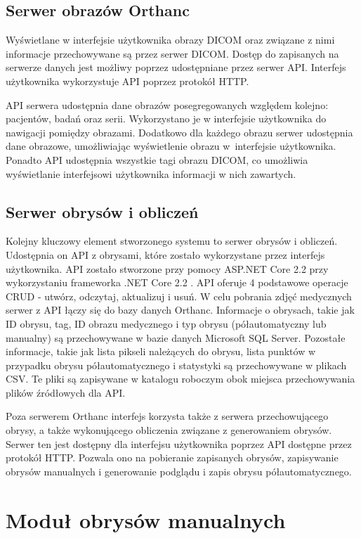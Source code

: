 \documentclass[a4paper,11pt,twoside,openright]{report}
\theoremstyle{definition}
\begin{document}
\subsection {Serwer obrazów Orthanc}

Wyświetlane w interfejsie użytkownika obrazy DICOM oraz związane z nimi informacje
przechowywane są przez serwer DICOM. Dostęp do zapisanych na serwerze danych jest
możliwy poprzez udostępniane przez serwer API. Interfejs użytkownika wykorzystuje
API poprzez protokół HTTP.

API serwera udostępnia dane obrazów posegregowanych względem kolejno: pacjentów,
badań oraz serii. Wykorzystano je w interfejsie użytkownika do nawigacji pomiędzy
obrazami. Dodatkowo dla każdego obrazu serwer udostępnia dane obrazowe, umożliwiając
wyświetlenie obrazu w~interfejsie użytkownika. Ponadto API udostępnia wszystkie
tagi obrazu DICOM, co umożliwia wyświetlanie interfejsowi użytkownika informacji
w nich zawartych.

\subsection {Serwer obrysów i obliczeń}
Kolejny kluczowy element stworzonego systemu to serwer obrysów i obliczeń. Udostępnia
on API z obrysami, które zostało wykorzystane przez interfejs użytkownika. API zostało
stworzone przy pomocy ASP.NET Core 2.2 \cite{ASPNET} przy wykorzystaniu frameworka
.NET Core 2.2 \cite{Charakterystyka dotnet}. API oferuje 4 podstawowe operacje CRUD
- utwórz, odczytaj, aktualizuj i usuń. W celu pobrania zdjęć medycznych serwer z API
łączy się do bazy danych Orthanc. Informacje o obrysach, takie jak ID obrysu, tag,
ID obrazu medycznego i typ obrysu (półautomatyczny lub manualny) są przechowywane
w bazie danych Microsoft SQL Server. Pozostałe informacje, takie jak lista pikseli
należących do obrysu, lista punktów w przypadku obrysu półautomatycznego i statystyki
są przechowywane w plikach CSV. Te pliki są zapisywane w katalogu roboczym obok
miejsca przechowywania plików źródłowych dla API.

Poza serwerem Orthanc interfejs korzysta także z serwera przechowującego obrysy,
a także wykonującego obliczenia związane z generowaniem obrysów. Serwer ten jest
dostępny dla interfejsu użytkownika poprzez API dostępne przez protokół HTTP.
Pozwala ono na pobieranie zapisanych obrysów, zapisywanie obrysów manualnych i
generowanie podglądu i zapis obrysu półautomatycznego.

\section {Moduł obrysów manualnych}
\end{document}
